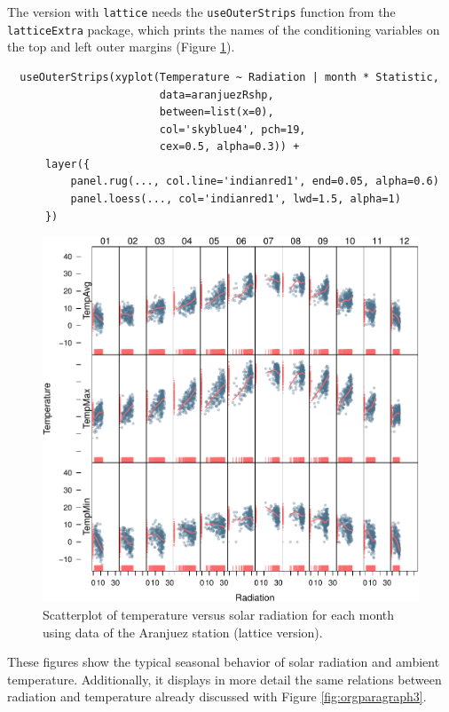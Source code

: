 The version with \texttt{lattice} needs the \texttt{useOuterStrips} function from
the \texttt{latticeExtra} package, which prints the names of the conditioning
variables on the top and left outer margins (Figure
\ref{fig:orgparagraph5}).


\lstset{language=R,label= ,caption= ,captionpos=b,numbers=none}
\begin{lstlisting}
  useOuterStrips(xyplot(Temperature ~ Radiation | month * Statistic,
                        data=aranjuezRshp,
                        between=list(x=0),
                        col='skyblue4', pch=19,
                        cex=0.5, alpha=0.3)) +
      layer({
          panel.rug(..., col.line='indianred1', end=0.05, alpha=0.6)
          panel.loess(..., col='indianred1', lwd=1.5, alpha=1)
      })
\end{lstlisting}

\begin{figure}[htb]
\centering
\includegraphics[width=.9\linewidth]{figs/aranjuezOuterStrips.pdf}
\caption{\label{fig:orgparagraph5}
Scatterplot of temperature versus solar radiation for each month using data of the Aranjuez station (lattice version).}
\end{figure}

These figures show the typical seasonal behavior of solar radiation
and ambient temperature. Additionally, it displays in more detail the
same relations between radiation and temperature already discussed
with Figure \ref{fig:orgparagraph3}.
